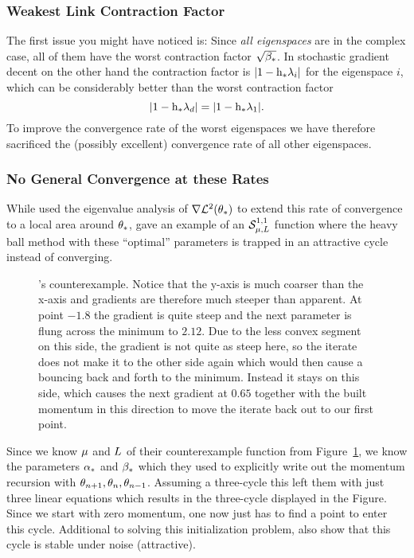 \subsubsection{Weakest Link Contraction Factor}

The first issue you
might have noticed is: Since \emph{all eigenspaces} are in the complex case,
all of them have the worst contraction factor \(\sqrt{\beta_*}\). In stochastic
gradient decent on the other hand the contraction factor is \(|1-\text{h}_*\lambda_i|\)
for the eigenspace \(i\), which can be considerably better than the worst
contraction factor 
\[|1-\text{h}_*\lambda_d|=|1-\text{h}_*\lambda_1|.\]
To improve the convergence rate of the worst eigenspaces we have therefore
sacrificed the (possibly excellent) convergence rate of all other eigenspaces.

\subsubsection{No General Convergence at these Rates}

While
\textcite[pp. 65-67]{polyakIntroductionOptimization1987} used the eigenvalue
analysis of \(\nabla\mathcal{L}^2(\theta_*)\) to extend this rate of convergence
to a local area around \(\theta_*\), \textcite[pp. 78-79]{lessardAnalysisDesignOptimization2016}
gave an example of an \(\mathcal{S}^{1,1}_{{\mu},{L}}\) function where
the heavy ball method with these ``optimal'' parameters is trapped in an attractive
cycle instead of converging. 
%
\begin{figure}[h]
	\centering
	\def\svgwidth{1\textwidth}
	
	\caption{
		\citeauthor{lessardAnalysisDesignOptimization2016}'s counterexample.
		Notice that the y-axis is much coarser than the x-axis and gradients are
		therefore much steeper than apparent. At point \(-1.8\) the gradient is
		quite steep and the next parameter is flung across the minimum to
		\(2.12\). Due to the less convex segment on this side, the gradient is
		not quite as steep here, so the iterate does not make it to the other
		side again which would then cause a bouncing back and forth to the
		minimum. Instead it stays on this side, which causes the next gradient
		at \(0.65\) together with the built momentum in this direction to move the
		iterate back out to our first point.
	}
	\label{fig: heavy ball counterexample}
\end{figure}

Since we know \(\mu\) and \(L\) of their counterexample function from
Figure~\ref{fig: heavy ball counterexample}, we know the parameters \(\alpha_*\)
and \(\beta_*\) which they used to explicitly write out the momentum recursion
with \(\theta_{n+1}, \theta_{n}, \theta_{n-1}\). Assuming a three-cycle
this left them with just three linear equations which results in the three-cycle
displayed in the Figure. Since we start with zero momentum, one now just has to
find a point to enter this cycle. Additional to solving this initialization
problem, \textcite[pp. 93-94]{lessardAnalysisDesignOptimization2016} also show
that this cycle is stable under noise (attractive).

